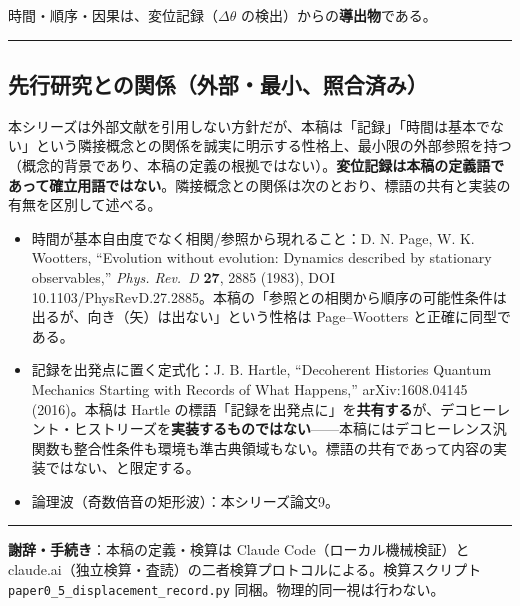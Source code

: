 \documentclass[
]{ltjsarticle}
\providecommand{\tightlist}{%
  \setlength{\itemsep}{0pt}\setlength{\parskip}{0pt}}
\begin{document}
時間・順序・因果は、変位記録（\(\Delta\theta\)
の検出）からの\textbf{導出物}である。

\begin{center}\rule{0.5\linewidth}{0.5pt}\end{center}

\subsection{先行研究との関係（外部・最小、照合済み）}\label{ux5148ux884cux7814ux7a76ux3068ux306eux95a2ux4fc2ux5916ux90e8ux6700ux5c0fux7167ux5408ux6e08ux307f}

本シリーズは外部文献を引用しない方針だが、本稿は「記録」「時間は基本でない」という隣接概念との関係を誠実に明示する性格上、最小限の外部参照を持つ（概念的背景であり、本稿の定義の根拠ではない）。\textbf{変位記録は本稿の定義語であって確立用語ではない}。隣接概念との関係は次のとおり、標語の共有と実装の有無を区別して述べる。

\begin{itemize}
\tightlist
\item
  時間が基本自由度でなく相関/参照から現れること：D. N. Page, W. K.
  Wootters, ``Evolution without evolution: Dynamics described by
  stationary observables,'' \emph{Phys. Rev.~D} \textbf{27}, 2885
  (1983), DOI
  10.1103/PhysRevD.27.2885。本稿の「参照との相関から順序の可能性条件は出るが、向き（矢）は出ない」という性格は
  Page--Wootters と正確に同型である。
\item
  記録を出発点に置く定式化：J. B. Hartle, ``Decoherent Histories Quantum
  Mechanics Starting with Records of What Happens,'' arXiv:1608.04145
  (2016)。本稿は Hartle
  の標語「記録を出発点に」を\textbf{共有する}が、デコヒーレント・ヒストリーズを\textbf{実装するものではない}------本稿にはデコヒーレンス汎関数も整合性条件も環境も準古典領域もない。標語の共有であって内容の実装ではない、と限定する。
\item
  論理波（奇数倍音の矩形波）：本シリーズ論文9。
\end{itemize}

\begin{center}\rule{0.5\linewidth}{0.5pt}\end{center}

\textbf{謝辞・手続き}：本稿の定義・検算は Claude
Code（ローカル機械検証）と
claude.ai（独立検算・査読）の二者検算プロトコルによる。検算スクリプト
\texttt{paper0\_5\_displacement\_record.py}
同梱。物理的同一視は行わない。
\end{document}
